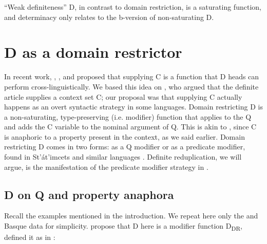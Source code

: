 \documentclass[output=paper,
modfonts
]{langscibook}
\begin{document}
``Weak definiteness'' D, in contrast to domain restriction, is a saturating function, and determinacy \citep{CoppockBeaver2015} only relates to the b-version of non-saturating D. 

\section{D as a domain restrictor} \label{sec:etxeberria:2}

In recent work, \citet{Giannakidou2004}, \citet{etxeberria2005}, and \citet{etxeberria-giannakidou2009, etxeberria-giannakidou2014} proposed that supplying C is a function that D heads can perform cross-linguistically. We based this idea on \citet{Westerstahl1984, Westerstaahl1985}, who argued that the definite article supplies a context set C; our proposal was that supplying C actually happens as an overt syntactic strategy in some languages. Domain restricting D is a non-saturating, type-preserving (i.e. modifier) function that applies to the Q and adds the C variable to the nominal argument of Q. This is akin to , since C is anaphoric to a property present in the context, as we said earlier. Domain restricting D comes in two forms: as a Q modifier or as a predicate modifier, found in St'\'at'imcets and similar languages \citep{matthewson2001, gillon2006, gillon2009}. Definite reduplication, we will argue, is the manifestation of the predicate modifier strategy in . 

\subsection{D on Q and property anaphora}

Recall the examples mentioned in the introduction. We repeat here only the  and Basque data for simplicity. \citet{etxeberria-giannakidou2009, etxeberria-giannakidou2014} propose that D here is a modifier function D\textsubscript{DR}, defined it as in :

\ea\label{ex:etxeberria:16}
 \citep{Giannakidou2004}
\z
\z \newpage
\end{document}
